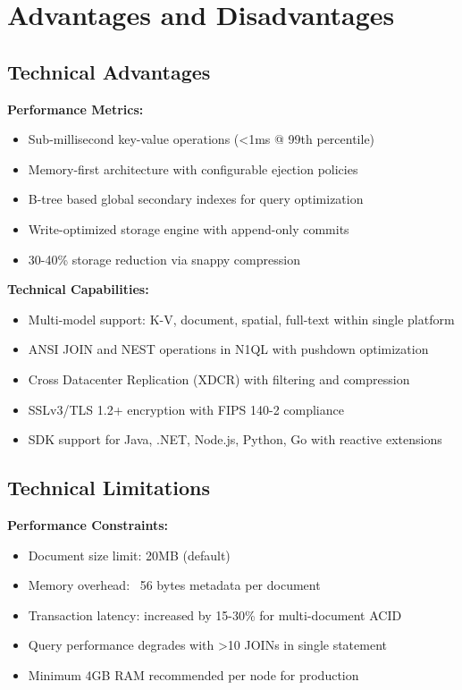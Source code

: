 \chapter{Advantages and Disadvantages}

\section{Technical Advantages}

\textbf{Performance Metrics:}
\begin{itemize}
  \item Sub-millisecond key-value operations (<1ms @ 99th percentile)
  \item Memory-first architecture with configurable ejection policies
  \item B-tree based global secondary indexes for query optimization
  \item Write-optimized storage engine with append-only commits
  \item 30-40\% storage reduction via snappy compression
\end{itemize}

\textbf{Technical Capabilities:}
\begin{itemize}
  \item Multi-model support: K-V, document, spatial, full-text within single platform
  \item ANSI JOIN and NEST operations in N1QL with pushdown optimization
  \item Cross Datacenter Replication (XDCR) with filtering and compression
  \item SSLv3/TLS 1.2+ encryption with FIPS 140-2 compliance
  \item SDK support for Java, .NET, Node.js, Python, Go with reactive extensions
\end{itemize}

\section{Technical Limitations}

\textbf{Performance Constraints:}
\begin{itemize}
  \item Document size limit: 20MB (default)
  \item Memory overhead: ~56 bytes metadata per document
  \item Transaction latency: increased by 15-30\% for multi-document ACID
  \item Query performance degrades with >10 JOINs in single statement
  \item Minimum 4GB RAM recommended per node for production
\end{itemize}

